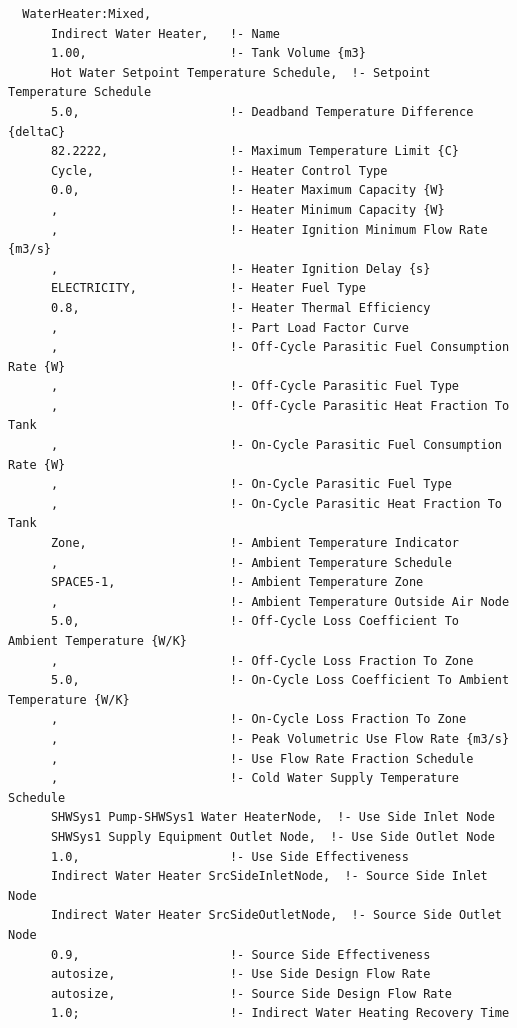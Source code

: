 \begin{lstlisting}
  WaterHeater:Mixed,
      Indirect Water Heater,   !- Name
      1.00,                    !- Tank Volume {m3}
      Hot Water Setpoint Temperature Schedule,  !- Setpoint Temperature Schedule
      5.0,                     !- Deadband Temperature Difference {deltaC}
      82.2222,                 !- Maximum Temperature Limit {C}
      Cycle,                   !- Heater Control Type
      0.0,                     !- Heater Maximum Capacity {W}
      ,                        !- Heater Minimum Capacity {W}
      ,                        !- Heater Ignition Minimum Flow Rate {m3/s}
      ,                        !- Heater Ignition Delay {s}
      ELECTRICITY,             !- Heater Fuel Type
      0.8,                     !- Heater Thermal Efficiency
      ,                        !- Part Load Factor Curve
      ,                        !- Off-Cycle Parasitic Fuel Consumption Rate {W}
      ,                        !- Off-Cycle Parasitic Fuel Type
      ,                        !- Off-Cycle Parasitic Heat Fraction To Tank
      ,                        !- On-Cycle Parasitic Fuel Consumption Rate {W}
      ,                        !- On-Cycle Parasitic Fuel Type
      ,                        !- On-Cycle Parasitic Heat Fraction To Tank
      Zone,                    !- Ambient Temperature Indicator
      ,                        !- Ambient Temperature Schedule
      SPACE5-1,                !- Ambient Temperature Zone
      ,                        !- Ambient Temperature Outside Air Node
      5.0,                     !- Off-Cycle Loss Coefficient To Ambient Temperature {W/K}
      ,                        !- Off-Cycle Loss Fraction To Zone
      5.0,                     !- On-Cycle Loss Coefficient To Ambient Temperature {W/K}
      ,                        !- On-Cycle Loss Fraction To Zone
      ,                        !- Peak Volumetric Use Flow Rate {m3/s}
      ,                        !- Use Flow Rate Fraction Schedule
      ,                        !- Cold Water Supply Temperature Schedule
      SHWSys1 Pump-SHWSys1 Water HeaterNode,  !- Use Side Inlet Node
      SHWSys1 Supply Equipment Outlet Node,  !- Use Side Outlet Node
      1.0,                     !- Use Side Effectiveness
      Indirect Water Heater SrcSideInletNode,  !- Source Side Inlet Node
      Indirect Water Heater SrcSideOutletNode,  !- Source Side Outlet Node
      0.9,                     !- Source Side Effectiveness
      autosize,                !- Use Side Design Flow Rate
      autosize,                !- Source Side Design Flow Rate
      1.0;                     !- Indirect Water Heating Recovery Time
\end{lstlisting}


